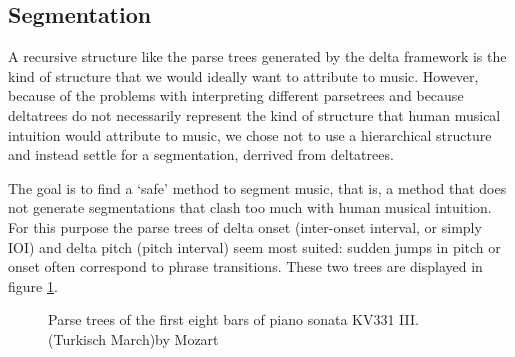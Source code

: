 \documentclass[a4paper,10pt]{article}
\begin{document}
\subsection{Segmentation}
\label{sec:segmentation}

A recursive structure like the parse trees generated by the delta framework is the kind of structure that we would ideally want to attribute to music. However, because of the problems with interpreting different parsetrees and because deltatrees do not necessarily represent the kind of structure that human musical intuition would attribute to music, we chose not to use a hierarchical structure and instead settle for a segmentation, derrived from deltatrees.

The goal is to find a `safe' method to segment music, that is, a method that does not generate segmentations that clash too much with human musical intuition. For this purpose the parse trees of delta onset (inter-onset interval, or simply IOI) and delta pitch (pitch interval) seem most suited: sudden jumps in pitch or onset often correspond to phrase transitions. These two trees are displayed in figure \ref{fig:pitchonsettrees}.

\begin{figure}
\centering
{}
\caption{Parse trees of the first eight bars of piano sonata KV331 III. (Turkisch March)by Mozart }
\label{fig:pitchonsettrees}
\end{figure}
\end{document}

